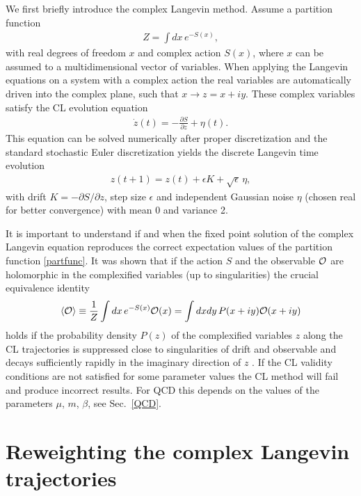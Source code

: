 \documentclass{PoS}
\newcommand{\Obs}{{\cal O}}
\begin{document}
We first briefly introduce the complex Langevin method. Assume a partition function
\begin{align}
Z = \int dx \, e^{-S(x)} ,
\label{partfunc}
\end{align}
with real degrees of freedom $x$ and complex action $S(x)$, where $x$ can be assumed to a multidimensional vector of variables. 
When applying the Langevin equations on a system with a complex action the real variables are automatically driven into the complex plane, such that $x \to z = x + i y$. These complex variables satisfy the CL evolution equation
\begin{align}
\dot z(t) = -\frac{\partial S}{\partial z} + \eta(t) .
\end{align}
This equation can be solved numerically after proper discretization and the standard stochastic Euler discretization yields the discrete Langevin time evolution
\begin{align}
z(t+1) = z(t) + \epsilon K + \sqrt{\epsilon}\,\eta ,
\end{align}
with drift $K = -\partial S/\partial z$, step size $\epsilon$ and
independent Gaussian noise $\eta$ (chosen real for better convergence) with mean 0 and variance 2.

It is important to understand if and when the fixed point solution of the complex Langevin equation reproduces the correct expectation values of the partition function \eqref{partfunc}.
It was shown that if the action $S$ and the observable ${\cal O}$ are holomorphic in the complexified variables (up to singularities)  the crucial equivalence identity
\begin{align}
\braket{\Obs} \equiv  \frac{1}{Z}\int dx \, e^{-S(x)} {\cal O}(x) = \int dx dy \, P(x+iy) {\cal O}(x+iy) 
\label{equiv}
\end{align}
holds if the probability density $P(z)$ of the complexified variables $z$ along the CL trajectories is suppressed close to singularities of drift and observable and decays sufficiently rapidly in the imaginary direction of $z$ \cite{Aarts:2011ax,Nagata:2016vkn}.
If the CL validity conditions are not satisfied for some parameter values the CL method will fail and produce incorrect results. For QCD this depends on the values of the parameters $\mu$, $m$, $\beta$, see Sec.\ \ref{QCD}.



\section{Reweighting the complex Langevin trajectories}
\end{document}
